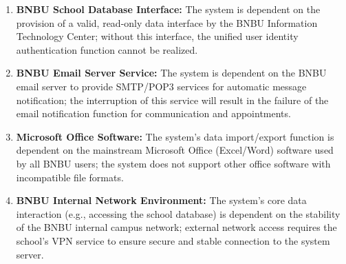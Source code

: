 \begin{enumerate}
\item \textbf{BNBU School Database Interface:} The system is dependent on the provision of a valid, read-only data interface by the BNBU Information Technology Center; without this interface, the unified user identity authentication function cannot be realized.
\item \textbf{BNBU Email Server Service:} The system is dependent on the BNBU email server to provide SMTP/POP3 services for automatic message notification; the interruption of this service will result in the failure of the email notification function for communication and appointments.
\item \textbf{Microsoft Office Software:} The system's data import/export function is dependent on the mainstream Microsoft Office (Excel/Word) software used by all BNBU users; the system does not support other office software with incompatible file formats.
\item \textbf{BNBU Internal Network Environment:} The system's core data interaction (e.g., accessing the school database) is dependent on the stability of the BNBU internal campus network; external network access requires the school's VPN service to ensure secure and stable connection to the system server.
\end{enumerate}
